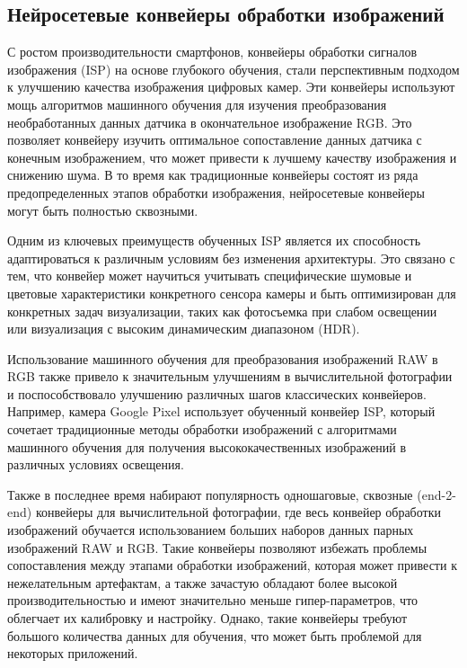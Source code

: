 \subsection{Нейросетевые конвейеры обработки изображений}\label{sect-2-2}

С ростом производительности смартфонов, конвейеры обработки сигналов изображения (ISP) на основе глубокого обучения, стали перспективным подходом к улучшению качества изображения цифровых камер. Эти конвейеры используют мощь алгоритмов машинного обучения для изучения преобразования необработанных данных датчика в окончательное изображение RGB. Это позволяет конвейеру изучить оптимальное сопоставление данных датчика с конечным изображением, что может привести к лучшему качеству изображения и снижению шума. В то время как традиционные конвейеры состоят из ряда предопределенных этапов обработки изображения, нейросетевые конвейеры могут быть полностью сквозными. 

Одним из ключевых преимуществ обученных ISP является их способность адаптироваться к различным условиям без изменения архитектуры. Это связано с тем, что конвейер может научиться учитывать специфические шумовые и цветовые характеристики конкретного сенсора камеры и быть оптимизирован для конкретных задач визуализации, таких как фотосъемка при слабом освещении или визуализация с высоким динамическим диапазоном (HDR).

Использование машинного обучения для преобразования изображений RAW в RGB также привело к значительным улучшениям в вычислительной фотографии и поспособствовало улучшению различных шагов классических конвейеров. Например, камера Google Pixel использует обученный конвейер ISP, который сочетает традиционные методы обработки изображений с алгоритмами машинного обучения для получения высококачественных изображений в различных условиях освещения.

Также в последнее время набирают популярность одношаговые, сквозные (end-2-end) конвейеры для вычислительной фотографии, где весь конвейер обработки изображений обучается использованием больших наборов данных парных изображений RAW и RGB. Такие конвейеры позволяют избежать проблемы сопоставления между этапами обработки изображений, которая может привести к нежелательным артефактам, а также зачастую обладают более высокой производительностью и имеют значительно меньше гипер-параметров, что облегчает их калибровку и настройку. Однако, такие конвейеры требуют большого количества данных для обучения, что может быть проблемой для некоторых приложений.


